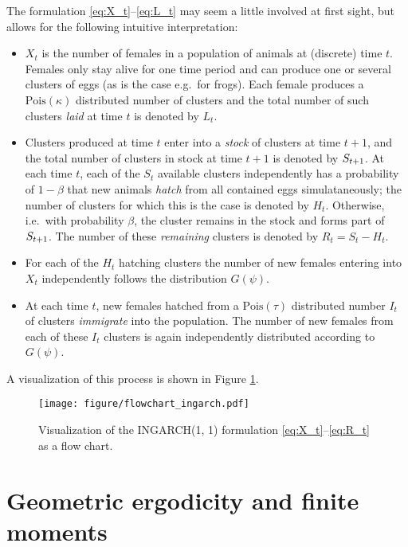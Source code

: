 \documentclass[10pt,a4paper]{article}
\begin{document}
The formulation \eqref{eq:X_t}--\eqref{eq:L_t} may seem a little involved at first sight, but allows for the following intuitive interpretation:
\begin{itemize}
\item $X_t$ is the number of females in a population of animals at (discrete) time $t$. Females only stay alive for one time period and can produce one or several clusters of eggs (as is the case e.g.\ for frogs). Each female produces a $\text{Pois}(\kappa)$ distributed number of clusters and the total number of such clusters \textit{laid} at time $t$ is denoted by $L_t$.
\item Clusters produced at time $t$ enter into a \textit{stock} of clusters at time $t + 1$, and the total number of clusters in stock at time $t + 1$ is denoted by $S_{t + 1}$. At each time $t$, each of the $S_t$ available clusters independently has a probability of $1 - \beta$ that new animals \textit{hatch} from all contained eggs simulataneously; the number of clusters for which this is the case is denoted by $H_t$. Otherwise, i.e.\ with probability $\beta$, the cluster remains in the stock and forms part of $S_{t + 1}$. The number of these \textit{remaining} clusters is denoted by $R_t = S_t - H_t$.
\item For each of the $H_t$ hatching clusters the number of new females entering into $X_t$ independently follows the distribution $G(\psi)$.
\item At each time $t$, new females hatched from a $\text{Pois}(\tau)$ distributed number $I_t$ of clusters \textit{immigrate} into the population. The number of new females from each of these $I_t$ clusters is again independently distributed according to $G(\psi)$.
\end{itemize}
A visualization of this process is shown in Figure \ref{fig:ingarch_flowchart}.

\begin{figure}[h!]
\texttt{[image: figure/flowchart\_ingarch.pdf]}
\caption{Visualization of the INGARCH(1, 1) formulation \eqref{eq:X_t}--\eqref{eq:R_t}  as a flow chart.}
\label{fig:ingarch_flowchart}
\end{figure}



\section{Geometric ergodicity and finite moments}
\end{document}
